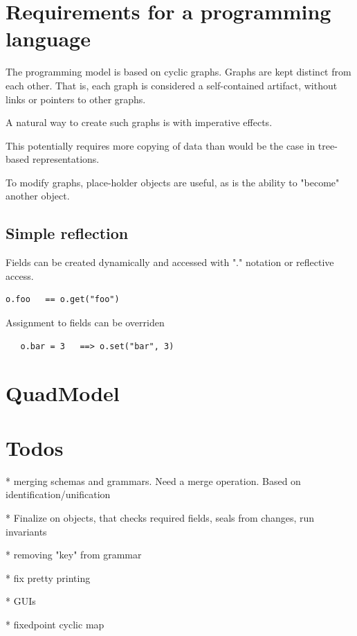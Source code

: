 \documentclass[11pt]{article}
\begin{document}
\section{Requirements for a programming language}

The programming model is based on cyclic graphs.
Graphs are kept distinct from each other. That is,
each graph is considered a self-contained
artifact, without links or pointers to other graphs.

A natural way to create such graphs is with 
imperative effects.

This potentially requires more copying of data
than would be the case in tree-based representations.

To modify graphs, place-holder objects are useful,
as is the ability to "become" another object.

\subsection{Simple reflection}

Fields can be created dynamically and accessed with
"." notation or reflective access.

\begin{verbatim}
o.foo   == o.get("foo")
\end{verbatim}

Assignment to fields can be overriden
\begin{verbatim}
   o.bar = 3   ==> o.set("bar", 3)
\end{verbatim}



\section{QuadModel}

\section{Todos}

* merging schemas and grammars. Need a merge operation. Based on identification/unification

* Finalize on objects, that checks required fields, seals from changes, run invariants
   
* removing "key" from grammar

* fix pretty printing 

* GUIs

* fixedpoint cyclic map
\end{document}
